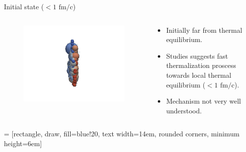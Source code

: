 \documentclass[11pt]{beamer}
\begin{document}
\begin{frame}{Initial state ($< 1 \textrm{ fm/c}$)}
\begin{columns}[onlytextwidth]
  \begin{column}{0.25\textwidth}
  \begin{figure}
   	\begin{center}
	\includegraphics[width=\textwidth]{pics/new50.png} 
	\end{center} 	
  	\end{figure} 
  \end{column}
  \begin{column}{0.75\textwidth}
  	\begin{itemize}
	\item Initially far from thermal equilibrium.
	\item Studies suggests fast thermalization proscess towards local thermal equilibrium ($< 1 \textrm{ fm/c}$).
	\item Mechanism not very well understood.
\end{itemize}
  \end{column}
\end{columns}  


 = [rectangle, draw, fill=blue!20, 
    text width=14em, rounded corners, minimum height=6em]
\begin{center}
\end{center}


\end{frame}
\end{document}
